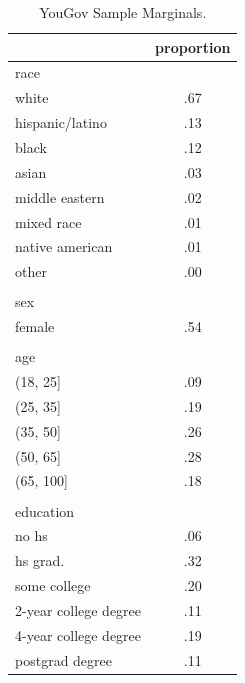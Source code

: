 \documentclass[12pt, letterpaper]{article}
\begin{document}
\begin{table}[h!]
\centering
\caption{YouGov Sample Marginals.}
\begin{tabular}{ l c }
\hline    
 & proportion \\
\hline
race   & \\
\hspace{2mm}white            &  .67\\
\hspace{2mm}hispanic/latino  &  .13\\
\hspace{2mm}black            &  .12\\
\hspace{2mm}asian            &  .03\\
\hspace{2mm}middle eastern   &  .02\\
\hspace{2mm}mixed race       &  .01\\
\hspace{2mm}native american  &  .01\\
\hspace{2mm}other            &  .00\\
& \\
sex & \\
\hspace{2mm}female           &  .54\\
& \\
age & \\
\hspace{2mm}(18, 25]     & .09 \\
\hspace{2mm}(25, 35]     & .19 \\
\hspace{2mm}(35, 50]     & .26 \\
\hspace{2mm}(50, 65]     & .28 \\
\hspace{2mm}(65, 100]    & .18 \\
& \\
education & \\
\hspace{2mm}no hs                 &   .06\\
\hspace{2mm}hs grad.            &     .32\\
\hspace{2mm}some college        &     .20\\
\hspace{2mm}2-year college degree &   .11\\
\hspace{2mm}4-year college degree &   .19\\
\hspace{2mm}postgrad degree       &   .11\\
\hline
\end{tabular}
\label{table:yg_dat}
\end{table}
\end{document}
